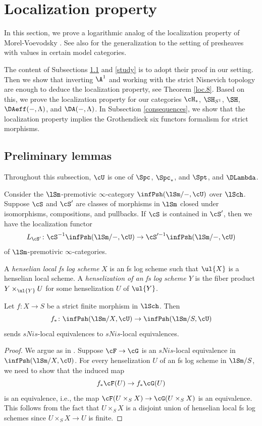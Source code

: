 \documentclass[10pt]{amsart}
\begin{document}
\section{Localization property}



In this section, we prove a logarithmic analog of the localization property of Morel-Voevodsky \cite[Theorem 2.21, p.\ 114]{MV}.
See also \cite[Th\'er\`eme 4.5.36]{Ayo07} for the generalization to the setting of presheaves with values in certain model categories.

The content of Subsections \ref{preliminary} and \ref{study} is to adopt their proof in our setting.
Then we show that inverting $\A^1$ and working with the strict Nisnevich topology are enough to deduce the localization property, see Theorem \ref{loc.8}.
Based on this, we prove the localization property for our categories $\cH_*$, $\SH_{S^1}$, $\SH$, $\DAeff(-,\Lambda)$, and $\DA(-,\Lambda)$.
In Subsection \ref{consequences}, we show that the localization property implies the Grothendieck six functors formalism for strict morphisms.


\subsection{Preliminary lemmas}
\label{preliminary}
Throughout this subsection, $\cU$ is one of $\Spc$, $\Spc_*$, and $\Spt$, and $\DLambda$.

Consider the $\lSm$-premotivic $\infty$-category $\infPsh(\lSm/-,\cU)$ over $\lSch$.
Suppose $\cS$ and $\cS'$ are classes of morphisms in $\lSm$ closed under isomorphisms, compositions, and pullbacks.
If $\cS$ is contained in $\cS'$, then we have the localization functor
\[
L_{\cS'}
\colon
\cS^{-1}\infPsh(\lSm/-,\cU)
\to
\cS'^{-1}\infPsh(\lSm/-,\cU)
\]
of $\lSm$-premotivic $\infty$-categories.

\begin{df}
A \emph{henselian local fs log scheme} $X$ is an fs log scheme such that $\ul{X}$ is a henselian local scheme.
A \emph{henselization of an fs log scheme $Y$} is the fiber product $Y\times_{\ul{Y}}U$ for some henselization $U$ of $\ul{Y}$.
\end{df}


\begin{lem}
\label{loc.1}
Let $f\colon X\to S$ be a strict finite morphism in $\lSch$.
Then
\begin{equation}
\label{loc.1.2}
f_*\colon \infPsh(\lSm/X,\cU)\to \infPsh(\lSm/S,\cU)
\end{equation}
sends $sNis$-local equivalences to $sNis$-local equivalences.
\end{lem}
\begin{proof}
We argue as in \cite[Proposition 1.27, p.\ 105]{MV}.
Suppose $\cF\to \cG$ is an $sNis$-local equivalence in $\infPsh(\lSm/X,\cU)$.
For every henselization $U$ of an fs log scheme in $\lSm/S$, we need to show that the induced map
\[
f_*\cF(U)\to f_*\cG(U)
\]
is an equivalence, i.e., the map $\cF(U\times_S X)\to \cG(U\times_S X)$ is an equivalence.
This follows from the fact that $U\times_S X$ is a disjoint union of henselian local fs log schemes since $U\times_S X\to U$ is finite.
\end{proof}
\end{document}

